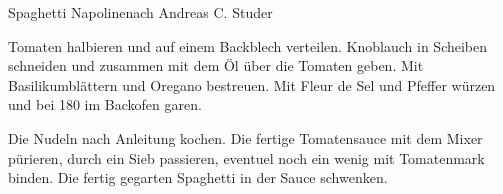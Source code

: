 \begin{recipe}{Spaghetti Napoline}{nach Andreas C. Studer}
  \inglist
  
  \steps
  Tomaten halbieren und auf einem Backblech verteilen. Knoblauch in Scheiben schneiden und
  zusammen mit dem Öl über die Tomaten geben. Mit Basilikumblättern und Oregano bestreuen. 
  Mit Fleur de Sel und Pfeffer würzen und bei 180 \celsius im Backofen garen.

  Die Nudeln nach Anleitung kochen. Die fertige Tomatensauce mit dem Mixer pürieren, durch 
  ein Sieb passieren, eventuel noch ein wenig mit Tomatenmark binden. Die fertig gegarten 
  Spaghetti in der Sauce schwenken.

\end{recipe}
